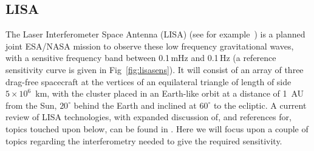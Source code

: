 \documentclass{article}
\begin{document}
\subsection{LISA}
The Laser Interferometer Space Antenna (LISA) (see for example~\cite{LISAsymposium,
NASAweb, ESAweb}) is a planned joint ESA/NASA mission to observe these low frequency
gravitational waves, with a sensitive frequency band between 0.1\,mHz and
0.1\,Hz (a reference sensitivity curve is given in Fig~\ref{fig:lisasens}). 
It will consist of an array of three drag-free spacecraft at the vertices
of an equilateral triangle of length of side $5\times10^6$~km, with the cluster 
placed in an Earth-like orbit at a distance of 1~AU from the Sun,
$20^{\circ}$ behind the Earth and inclined at $60^{\circ}$ to the ecliptic. A
current review of LISA technologies, with expanded discussion of, and references
for, topics touched upon below, can be found in \cite{Jennrich:2009}. Here we
will focus upon a couple of topics regarding the interferometry needed to give
the required sensitivity.

\end{document}
